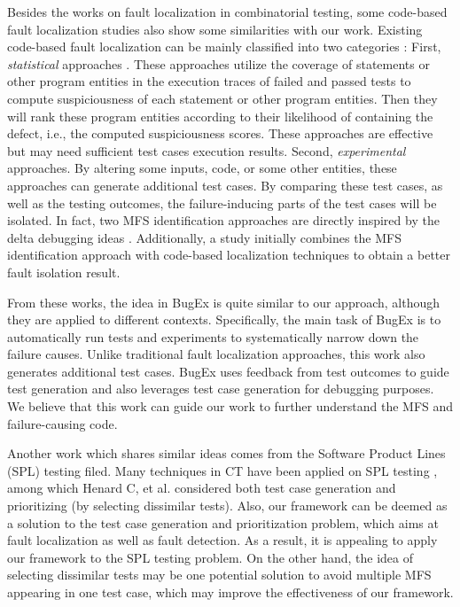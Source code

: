 \documentclass[journal,12pt,onecolumn,draftclsnofoot,]{IEEEtran}
\begin{document}
Besides the works on fault localization in combinatorial testing, some code-based fault localization studies also show some similarities with our work. Existing code-based fault localization can be mainly classified into two categories \cite{robetaler2012isolating}:  First, \emph{statistical}
approaches \cite{jones2002visualization,liblit2003bug,liu2005sober}.  These approaches utilize the coverage of statements or other program entities in the execution traces of failed and passed tests to compute suspiciousness of each statement or other program entities. Then they will rank these program entities according to their likelihood of containing the defect, i.e., the computed suspiciousness scores. These approaches are effective but may need sufficient test cases execution results. Second, \emph{experimental} approaches\cite{zeller2002simplifying,zeller1999yesterday,misherghi2006hdd}. By altering some inputs, code, or some other entities, these approaches can generate additional test cases. By comparing these test cases, as well as the testing outcomes, the failure-inducing parts of the test cases will be isolated. In fact, two MFS identification approaches are directly inspired by the delta debugging ideas \cite{zhang2011characterizing,li2012improved}. Additionally, a study \cite{ghandehari2013fault} initially combines the MFS identification approach with code-based localization techniques to obtain a better fault isolation result.

From these works, the idea in BugEx \cite{robetaler2012isolating} is quite similar to our approach, although they are applied to different contexts. Specifically, the main task of BugEx is to automatically run tests and experiments to systematically narrow down the failure causes. Unlike traditional fault localization approaches, this work also generates additional test cases. BugEx uses feedback from test outcomes to guide test generation and also leverages test case generation for debugging purposes. We believe that this work can guide our work to further understand the MFS and failure-causing code.

Another work which shares similar ideas comes from the Software Product Lines (SPL) testing filed\cite{henard2014bypassing,perrouin2010automated,lopez2014parallel,lopez2015first}. Many techniques in CT have been applied on SPL testing \cite{lopez2015first}, among which Henard C, et al. \cite{henard2014bypassing} considered both test case generation and prioritizing (by selecting dissimilar tests). Also, our framework can be deemed as a solution to the test case generation and prioritization problem, which aims at fault localization as well as fault detection. As a result, it is appealing to apply our framework to the SPL testing problem. On the other hand, the idea of selecting dissimilar tests may be one potential solution to avoid multiple MFS appearing in one test case, which may improve the effectiveness of our framework.
\end{document}
